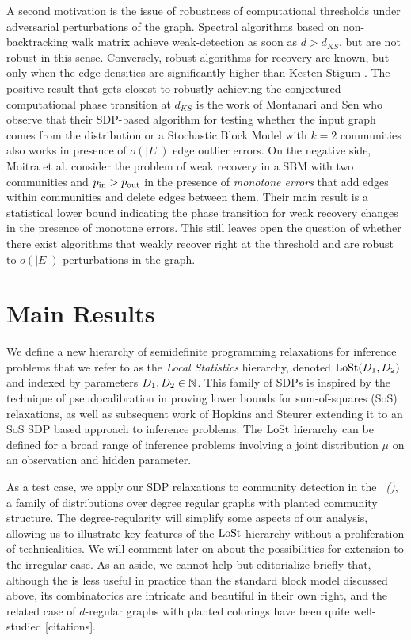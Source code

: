 A second motivation is the issue of robustness of computational thresholds under adversarial perturbations of the graph. Spectral algorithms based on non-backtracking walk matrix \cite{bordenave2015non} achieve weak-detection as soon as $d> d_{KS}$, but are not robust in this sense. Conversely, robust algorithms for recovery are known, but only when the edge-densities are significantly higher than Kesten-Stigum \cite{guedon2016community,makarychev2016learning,CharikarSV17,SteinhardtVC16}. The positive result that gets closest to robustly achieving the conjectured computational phase transition at $d_{KS}$ is the work of Montanari and Sen \cite{montanari2015semidefinite} who observe that their SDP-based algorithm for testing whether the input graph comes from the \ER distribution or a Stochastic Block Model with $k = 2$ communities also works in presence of $o(|E|)$ edge outlier errors.  On the negative side, Moitra et al. \cite{moitra2012singly} consider the problem of weak recovery in a SBM with two communities and $p_{\textup{in}} > p_{\textup{out}}$ in the presence of {\it monotone errors} that add edges within communities and delete edges between them. Their main result is a statistical lower bound indicating the phase transition for weak recovery changes in the presence of monotone errors. This still leaves open the question of whether there exist algorithms that weakly recover right at the threshold and are robust to $o(|E|)$ perturbations in the graph. 

\section{Main Results} %
\label{sec:main_results}

We define a new hierarchy of semidefinite programming relaxations for inference problems that we refer to as the \emph{Local Statistics} hierarchy, denoted $\operatorname{LoSt}(D_1,D_2)$ and indexed by parameters $D_1,D_2 \in \mathbb{N}$. This family of SDPs is inspired by the technique of pseudocalibration in proving lower bounds for sum-of-squares (SoS) relaxations, as well as subsequent work of Hopkins and Steurer \cite{hopkins2017efficient} extending it to an SoS SDP based approach to inference problems. The $\operatorname{LoSt}$ hierarchy can be defined for a broad range of inference problems involving a joint distribution $\mu$ on an observation and hidden parameter.

As a test case, we apply our SDP relaxations to community detection in the \emph{\fullmodel~(\model)}, a family of distributions over degree regular graphs with planted community structure. The degree-regularity will simplify some aspects of our analysis, allowing us to illustrate key features of the $\operatorname{LoSt}$ hierarchy without a proliferation of technicalities. We will comment later on about the possibilities for extension to the irregular case. As an aside, we cannot help but editorialize briefly that, although the \model is less useful in practice than the standard block model discussed above, its combinatorics are intricate and beautiful in their own right, and the related case of $d$-regular graphs with planted colorings have been quite well-studied [citations].

